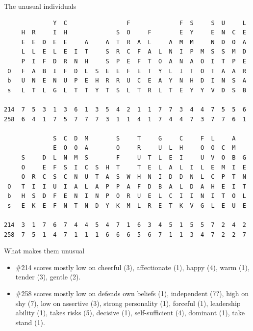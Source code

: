 \documentclass[pdf]{prosper}
\begin{document}
\begin{slide}{The unusual individuals}


{\scriptsize
\begin{verbatim}
              Y  C                 F              F  S     S  U     L
     H  R     I  H              S  O     F        E  Y     E  N  C  E
     E  E  D  E  E     A     A  T  R  A  L     A  M  M     N  D  O  A
     L  L  E  L  E  I  T     S  R  C  F  A  L  N  I  P  M  S  S  M  D
     P  I  F  D  R  N  H     S  P  E  F  T  O  A  N  A  O  I  T  P  E
 O   F  A  B  I  F  D  L  S  E  E  F  E  T  Y  L  I  T  O  T  A  A  R
 b   U  N  E  N  U  P  E  H  R  R  U  C  E  A  Y  N  H  D  I  N  S  A
 s   L  T  L  G  L  T  T  Y  T  S  L  T  R  L  T  E  Y  Y  V  D  S  B

214  7  5  3  1  3  6  1  3  5  4  2  1  1  7  7  3  4  4  7  5  5  6
258  6  4  1  7  5  7  7  7  3  1  1  4  1  7  4  4  7  3  7  7  6  1

              S  C  D  M        S     T     G     C     F  L     A
              E  O  O  A        O     R     U  L  H     O  O  C  M
     S     D  L  N  M  S        F     U  T  L  E  I     U  V  O  B  G
     O     E  F  S  I  C  S  H  T     T  E  L  A  L  I  L  E  M  I  E
     O  R  C  S  C  N  U  T  A  S  W  H  N  I  D  D  N  L  C  P  T  N
 O   T  I  I  U  I  A  L  A  P  P  A  F  D  B  A  L  D  A  H  E  I  T
 b   H  S  D  F  E  N  I  N  P  O  R  U  E  L  C  I  I  N  I  T  O  L
 s   E  K  E  F  N  T  N  D  Y  K  M  L  R  E  T  K  V  G  L  E  U  E

214  3  1  7  6  7  4  4  5  4  7  1  6  3  4  5  1  5  5  7  2  4  2
258  7  5  1  4  7  1  1  1  6  6  6  5  6  7  1  1  3  4  7  2  2  7
\end{verbatim}
}

\end{slide}

\begin{slide}{What makes them unusual}

\begin{itemize}
\item \#214 scores mostly low on cheerful (3), affectionate (1), happy (4), warm (1), tender (3), gentle (2).
\item \#258 scores mostly low on defends own beliefs (1), independent (7?), high on shy (7), low on assertive (3), strong personality (1), forceful (1), leadership ability (1), takes risks (5), decisive (1), self-sufficient (4), dominant (1), take stand (1). 
\end{itemize}
\end{slide}
\end{document}
